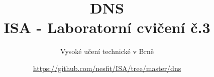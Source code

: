 \documentclass[a4paper,11pt]{article}
\title{DNS\\
{\bf\large ISA - Laboratorní cvičení č.3}}
\author{Vysoké učení technické v Brně}
\date{\url{https://github.com/nesfit/ISA/tree/master/dns}}
\begin{document}
{\let\newpage\relax\maketitle}


\end{document}
